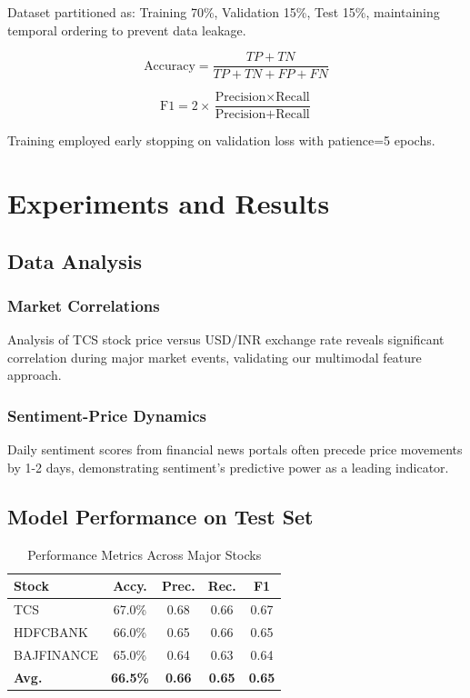 \documentclass[conference]{IEEEtran}
\begin{document}
Dataset partitioned as: Training 70\%, Validation 15\%, Test 15\%, maintaining temporal ordering to prevent data leakage.

\begin{equation}
\text{Accuracy} = \frac{TP + TN}{TP + TN + FP + FN}
\end{equation}

\begin{equation}
\text{F1} = 2 \times \frac{\text{Precision} \times \text{Recall}}{\text{Precision} + \text{Recall}}
\end{equation}

Training employed early stopping on validation loss with patience=5 epochs.

\section{Experiments and Results}
\label{sec:experiments}

\subsection{Data Analysis}

\subsubsection{Market Correlations}

Analysis of TCS stock price versus USD/INR exchange rate reveals significant correlation during major market events, validating our multimodal feature approach.

\subsubsection{Sentiment-Price Dynamics}

Daily sentiment scores from financial news portals often precede price movements by 1-2 days, demonstrating sentiment's predictive power as a leading indicator.

\subsection{Model Performance on Test Set}

\begin{table}[h]
\centering
\small
\setlength{\tabcolsep}{3pt}
\begin{tabular}{lcccc}
\toprule
\textbf{Stock} & \textbf{Accy.} & \textbf{Prec.} & \textbf{Rec.} & \textbf{F1} \\
\midrule
TCS & 67.0\% & 0.68 & 0.66 & 0.67 \\
HDFCBANK & 66.0\% & 0.65 & 0.66 & 0.65 \\
BAJFINANCE & 65.0\% & 0.64 & 0.63 & 0.64 \\
\midrule
\textbf{Avg.} & \textbf{66.5\%} & \textbf{0.66} & \textbf{0.65} & \textbf{0.65} \\
\bottomrule
\end{tabular}
\caption{Performance Metrics Across Major Stocks}
\label{tab:results}
\end{table}
\end{document}

